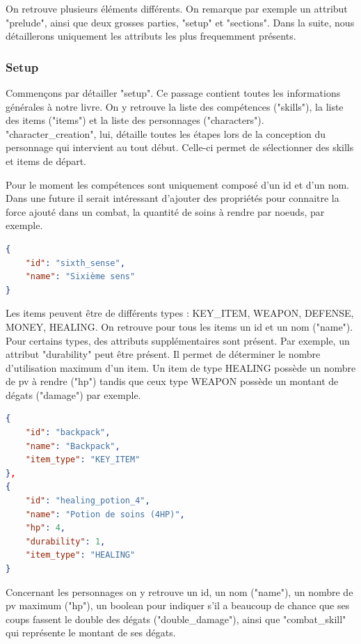 		On retrouve plusieurs éléments différents. On remarque par exemple un attribut "prelude", ainsi que deux grosses parties, "setup" et "sections". Dans la suite, nous détaillerons uniquement les attributs les plus frequemment présents.

		\subsubsection{Setup}

			Commençons par détailler "setup". Ce passage contient toutes les informations générales à notre livre. On y retrouve la liste des compétences ("skills"), la liste des items ("items") et la liste des personnages ("characters"). "character\_creation", lui, détaille toutes les étapes lors de la conception du personnage qui intervient au tout début. Celle-ci permet de sélectionner des skills et items de départ.

			Pour le moment les compétences sont uniquement composé d'un id et d'un nom. Dans une future \maj{} il serait intéressant d'ajouter des propriétés pour connaitre la force ajouté dans un combat, la quantité de soins à rendre par noeuds, par exemple.

\begin{lstlisting}[language=json, caption=Exemple de compétence]
{
	"id": "sixth_sense",
	"name": "Sixième sens"
}
\end{lstlisting}

			Les items peuvent être de différents types : KEY\_ITEM, WEAPON, DEFENSE, MONEY, HEALING. On retrouve pour tous les items un id et un nom ("name"). Pour certains types, des attributs supplémentaires sont présent. Par exemple, un attribut "durability" peut être présent. Il permet de déterminer le nombre d'utilisation maximum d'un item. Un item de type HEALING possède un nombre de pv à rendre ("hp") tandis que ceux type WEAPON possède un montant de dégats ("damage") par exemple.

\begin{lstlisting}[language=json, caption=Exemple d'items]
{
	"id": "backpack",
	"name": "Backpack",
	"item_type": "KEY_ITEM"
},
{
	"id": "healing_potion_4",
	"name": "Potion de soins (4HP)",
	"hp": 4,
	"durability": 1,
	"item_type": "HEALING"
}
\end{lstlisting}

			Concernant les personnages on y retrouve un id, un nom ("name"), un nombre de pv maximum ("hp"), un boolean pour indiquer s'il a beaucoup de chance que ses coups fassent le double des dégats ("double\_damage"), ainsi que "combat\_skill" qui représente le montant de ses dégats.

